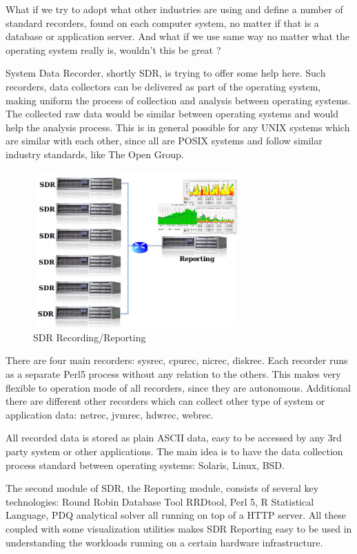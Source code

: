 \bigskip
\noindent
What if we try to adopt what other industries are using and define 
a number of standard recorders, found on each computer system, 
no matter if that is a database or application server. And what if we use 
same way no matter what the operating system really is, wouldn't this be great ?

System Data Recorder, shortly SDR, is trying to offer some help here. Such
recorders, data collectors can be delivered as part of the operating system, 
making uniform the process of collection and analysis between operating 
systems. The collected raw data would be similar between operating systems 
and would help the analysis process. This is in general possible for any 
UNIX systems which are similar with each other, since all are POSIX systems 
and follow similar industry standards, like The Open Group. 

\begin{figure}[!ht]
\centering
\includegraphics[width=80mm,height=60mm]{sdr-schema1.png}
\caption{SDR Recording/Reporting}
\label{fig:sdr-schema1}
\end{figure}

\bigskip
\noindent
There are four main recorders: sysrec, cpurec, nicrec, diskrec. 
Each recorder runs as a separate Perl5 process without any relation 
to the others. This makes very flexible to operation mode of all recorders, 
since they are autonomous. Additional there are different other recorders 
which can collect other type of system or application data: 
netrec, jvmrec, hdwrec, webrec. 

\noindent
All recorded data is stored as plain ASCII data, easy to be accessed by any 
3rd party system or other applications. The main idea is to have the data 
collection process standard between operating systems: Solaris, Linux, BSD. 

\bigskip
\noindent
The second module of SDR, the Reporting module, consists of several key
technologies: Round Robin Database Tool RRDtool, Perl 5, R Statistical Language, 
PDQ analytical solver all running on top of a HTTP server. All these coupled
with some visualization utilities makes SDR Reporting easy to be used in 
understanding the workloads running on a certain hardware infrastructure.

\endinput
